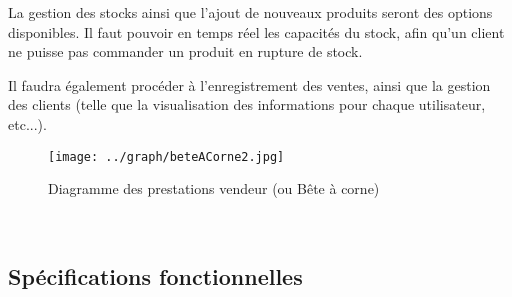 \documentclass[a4paper]{article}
\begin{document}
		La gestion des stocks ainsi que l'ajout de nouveaux produits seront des options disponibles. Il faut pouvoir en temps réel les capacités du stock, afin qu'un client ne puisse pas commander un produit en rupture de stock.
		
		Il faudra également procéder à l'enregistrement des ventes, ainsi que la gestion des clients (telle que la visualisation des informations pour chaque utilisateur, etc...).
	
	\begin{figure}[!t]
		\centering
			\texttt{[image: ../graph/beteACorne2.jpg]}
			\caption{Diagramme des prestations vendeur (ou Bête à corne)}
	\end{figure}
	
	\newpage
	~ 
	\newpage
	\subsection{Spécifications fonctionnelles}
\end{document}
